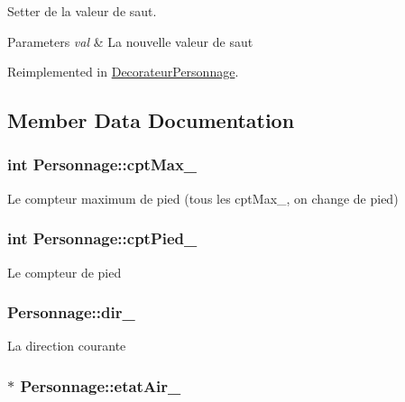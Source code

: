 Setter de la valeur de saut. 


\begin{DoxyParams}{Parameters}
{\em val} & La nouvelle valeur de saut \\
\hline
\end{DoxyParams}


Reimplemented in \hyperlink{classDecorateurPersonnage_a0570f794908b1b1426bdc4b5ca2b1223}{Decorateur\-Personnage}.



\subsection{Member Data Documentation}
\hypertarget{classPersonnage_a03257f632724ecf780c246ffd6d4b607}{
\subsubsection[{cpt\-Max\-\_\-}]{\setlength{\rightskip}{0pt plus 5cm}int Personnage\-::cpt\-Max\-\_\-\hspace{0.3cm}{\ttfamily [protected]}}}\label{classPersonnage_a03257f632724ecf780c246ffd6d4b607}
Le compteur maximum de pied (tous les cpt\-Max\-\_\-, on change de pied) \hypertarget{classPersonnage_aa6e11d0b6c10c588c31b239e3fc7f7bf}{
\subsubsection[{cpt\-Pied\-\_\-}]{\setlength{\rightskip}{0pt plus 5cm}int Personnage\-::cpt\-Pied\-\_\-\hspace{0.3cm}{\ttfamily [protected]}}}\label{classPersonnage_aa6e11d0b6c10c588c31b239e3fc7f7bf}
Le compteur de pied \hypertarget{classPersonnage_aa125be5384227832c1289f23cd21e3b9}{
\subsubsection[{dir\-\_\-}]{ Personnage\-::dir\-\_\-\hspace{0.3cm}{\ttfamily [protected]}}}\label{classPersonnage_aa125be5384227832c1289f23cd21e3b9}
La direction courante \hypertarget{classPersonnage_a8009b989cc0b81a13e51cbe6c9a6aa57}{
\subsubsection[{etat\-Air\-\_\-}]{$\ast$ Personnage\-::etat\-Air\-\_\-\hspace{0.3cm}{\ttfamily [protected]}}}\label{classPersonnage_a8009b989cc0b81a13e51cbe6c9a6aa57}
